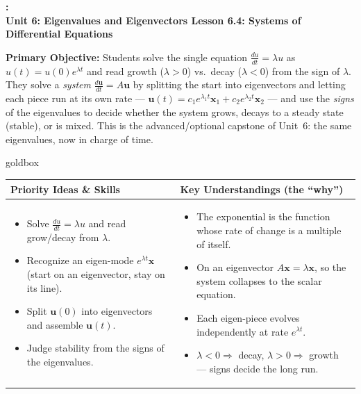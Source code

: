 \documentclass[10pt]{article}
\newcommand{\uu}{\mathbf{u}}
\newcommand{\xx}{\mathbf{x}}
\newcommand{\UnitNumberName}{Unit 6: Eigenvalues and Eigenvectors \quad}
\newcommand{\LessonNumberName}{Lesson 6.4: Systems of Differential Equations}
\begin{document}
\begin{center}
    {\Large\bfseries \CourseName: \SchoolYear \\
    {\small\bfseries \UnitNumberName \LessonNumberName}}
\end{center}

\begin{tcolorbox}[colback=blush, colframe=burgundy, boxrule=0.9pt, arc=2mm,
    left=2mm, right=2mm, top=1.5mm, bottom=1.5mm]
    \textbf{Primary Objective:} Students solve the single equation $\frac{du}{dt}=\lambda u$ as
    $u(t)=u(0)e^{\lambda t}$ and read growth ($\lambda>0$) vs.\ decay ($\lambda<0$) from the sign of $\lambda$.
    They solve a \emph{system} $\frac{d\uu}{dt}=A\uu$ by splitting the start into eigenvectors and letting each
    piece run at its own rate --- $\uu(t)=c_1e^{\lambda_1 t}\xx_1+c_2e^{\lambda_2 t}\xx_2$ --- and use the
    \emph{signs} of the eigenvalues to decide whether the system grows, decays to a steady state (stable), or
    is mixed. This is the advanced/optional capstone of Unit~6: the same eigenvalues, now in charge of time.
\end{tcolorbox}

\renewcommand{\arraystretch}{1.4}
\begin{skillbox}{goldbox}
\begin{tabularx}{\linewidth}{@{}X|X@{}}
\textbf{Priority Ideas \& Skills} & \textbf{Key Understandings (the ``why'')} \\[2pt]
\hline
\vspace{-6pt}
\begin{itemize}[leftmargin=1.1em, nosep, after=\vspace{2pt}]
  \item Solve $\frac{du}{dt}=\lambda u$ and read grow/decay from $\lambda$.
  \item Recognize an eigen-mode $e^{\lambda t}\xx$ (start on an eigenvector, stay on its line).
  \item Split $\uu(0)$ into eigenvectors and assemble $\uu(t)$.
  \item Judge stability from the signs of the eigenvalues.
\end{itemize}
&
\vspace{-6pt}
\begin{itemize}[leftmargin=1.1em, nosep, after=\vspace{2pt}]
  \item The exponential is the function whose rate of change is a multiple of itself.
  \item On an eigenvector $A\xx=\lambda\xx$, so the system collapses to the scalar equation.
  \item Each eigen-piece evolves independently at rate $e^{\lambda t}$.
  \item $\lambda<0\Rightarrow$ decay, $\lambda>0\Rightarrow$ growth --- signs decide the long run.
\end{itemize}
\end{tabularx}
\end{skillbox}
\end{document}
